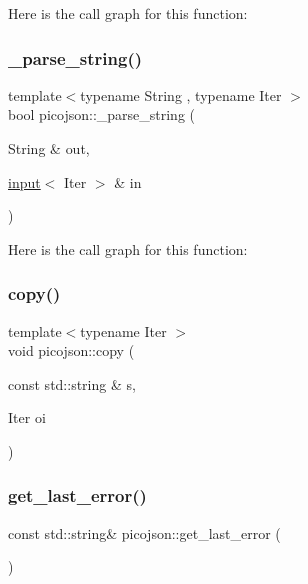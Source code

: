 Here is the call graph for this function\+:
\hypertarget{namespacepicojson_a9a1d94feb2718129796225d77c9e8d11}{}\label{namespacepicojson_a9a1d94feb2718129796225d77c9e8d11} 
\subsubsection{\texorpdfstring{\+\_\+parse\+\_\+string()}{\_parse\_string()}}
{\footnotesize\ttfamily template$<$typename String , typename Iter $>$ \\
bool picojson\+::\+\_\+parse\+\_\+string (\begin{DoxyParamCaption}\item[{String \&}]{out,  }\item[{\hyperlink{classpicojson_1_1input}{input}$<$ Iter $>$ \&}]{in }\end{DoxyParamCaption})\hspace{0.3cm}{\ttfamily [inline]}}

Here is the call graph for this function\+:
\hypertarget{namespacepicojson_abc2111aa71797805957a4296fdf9c66d}{}\label{namespacepicojson_abc2111aa71797805957a4296fdf9c66d} 
\subsubsection{\texorpdfstring{copy()}{copy()}}
{\footnotesize\ttfamily template$<$typename Iter $>$ \\
void picojson\+::copy (\begin{DoxyParamCaption}\item[{const std\+::string \&}]{s,  }\item[{Iter}]{oi }\end{DoxyParamCaption})}

\hypertarget{namespacepicojson_a1ba78f161e46341e0c2fd705ff8b0210}{}\label{namespacepicojson_a1ba78f161e46341e0c2fd705ff8b0210} 
\subsubsection{\texorpdfstring{get\+\_\+last\+\_\+error()}{get\_last\_error()}}
{\footnotesize\ttfamily const std\+::string\& picojson\+::get\+\_\+last\+\_\+error (\begin{DoxyParamCaption}{ }\end{DoxyParamCaption})\hspace{0.3cm}{\ttfamily [inline]}}

